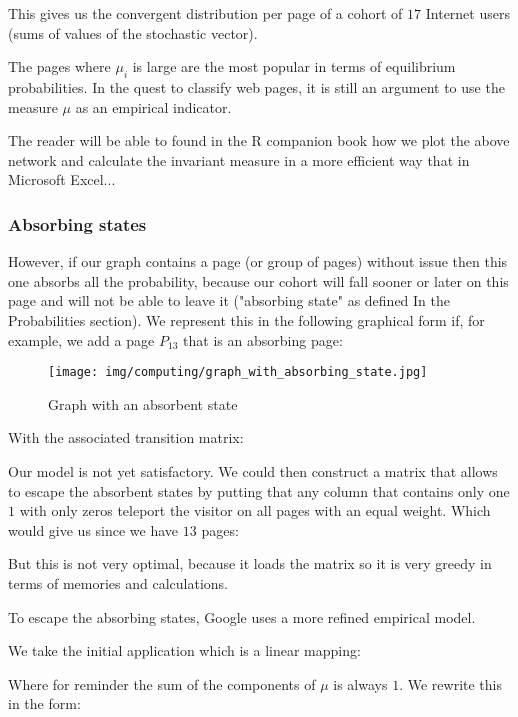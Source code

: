 	This gives us the convergent distribution per page of a cohort of $17$ Internet users (sums of values of the stochastic vector).

	The pages where $\mu_i$ is large are the most popular in terms of equilibrium probabilities. In the quest to classify web pages, it is still an argument to use the measure $\mu$ as an empirical indicator.
	
	\begin{tcolorbox}[title=Remark,colframe=black,arc=10pt]
	The reader will be able to found in the R companion book how we plot the above network and calculate the invariant measure in a more efficient way that in Microsoft Excel...
	\end{tcolorbox}
	
	\subsubsection{Absorbing states}
	However, if our graph contains a page (or group of pages) without issue then this one absorbs all the probability, because our cohort will fall sooner or later on this page and will not be able to leave it ("absorbing state" as defined In the Probabilities section). We represent this in the following graphical form if, for example, we add a page $P_{13}$ that is an absorbing page:
	\begin{figure}[H]
		\centering
		\texttt{[image: img/computing/graph\_with\_absorbing\_state.jpg]}
		\caption{Graph with an absorbent state}
	\end{figure}
	With the associated transition matrix:
	\setcounter{MaxMatrixCols}{20}
	
	Our model is not yet satisfactory. We could then construct a matrix that allows to escape the absorbent states by putting that any column that contains only one $1$ with only zeros teleport the visitor on all pages with an equal weight. Which would give us since we have $13$ pages:
	\setcounter{MaxMatrixCols}{20}
	
	But this is not very optimal, because it loads the matrix so it is very greedy in terms of memories and calculations.

	To escape the absorbing states, Google uses a more refined empirical model.

	We take the initial application which is a linear mapping:
	
	Where for reminder the sum of the components of $\mu$ is always $1$. We rewrite this in the form:
	
